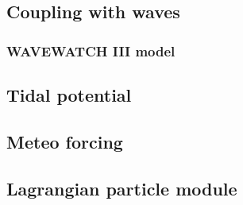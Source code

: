 \documentclass{report}
\newcommand{\todo}[1]{This section still has to be written by #1}
\begin{document}
		\subsection{Coupling with waves}
		

		\subsubsection{WAVEWATCH III model}
		

		\subsection{Tidal potential}
		

		\subsection{Meteo forcing}
		

		\subsection{Lagrangian particle module}
		






%	
%	
\end{document}
